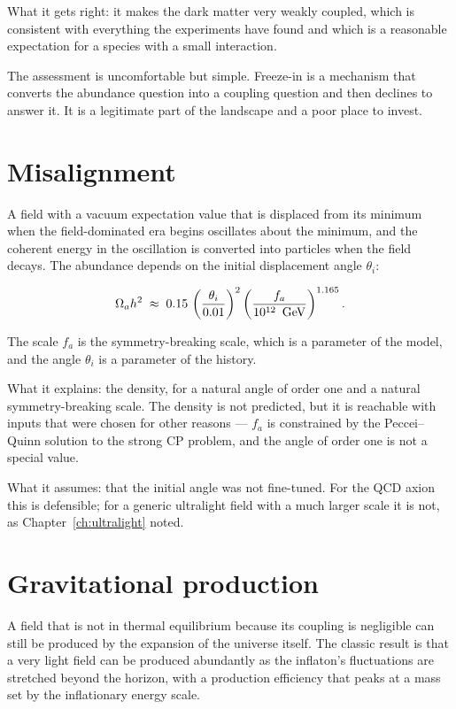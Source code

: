 What it gets right: it makes the dark matter very weakly coupled, which is
consistent with everything the experiments have found and which is a
reasonable expectation for a species with a small interaction.

The assessment is uncomfortable but simple. Freeze-in is a mechanism that
converts the abundance question into a coupling question and then declines
to answer it. It is a legitimate part of the landscape and a poor place to
invest.

\section{Misalignment}A field with a vacuum expectation value that is displaced
from its minimum when the field-dominated era begins oscillates about the
minimum, and the coherent energy in the oscillation is converted into
particles when the field decays. The abundance depends on the initial
displacement angle $\theta_i$:

\[
\Omega_a h^2 \;\approx\; 0.15\,
\left(\frac{\theta_i}{0.01}\right)^{2}
\left(\frac{f_a}{10^{12}\ \,\mathrm{GeV}}\right)^{1.165}.
\]

The scale $f_a$ is the symmetry-breaking scale, which is a parameter of the
model, and the angle $\theta_i$ is a parameter of the history.

What it explains: the density, for a natural angle of order one and a
natural symmetry-breaking scale. The density is not predicted, but it is
reachable with inputs that were chosen for other reasons --- $f_a$ is
constrained by the Peccei--Quinn solution to the strong CP problem, and the
angle of order one is not a special value.

What it assumes: that the initial angle was not fine-tuned. For the QCD
axion this is defensible; for a generic ultralight field with a much larger
scale it is not, as Chapter~\ref{ch:ultralight} noted.

\section{Gravitational production}A field that is not in thermal equilibrium because
its coupling is negligible can still be produced by the expansion of the
universe itself. The classic result is that a very light field can be
produced abundantly as the inflaton's fluctuations are stretched beyond the
horizon, with a production efficiency that peaks at a mass set by the
inflationary energy scale.

